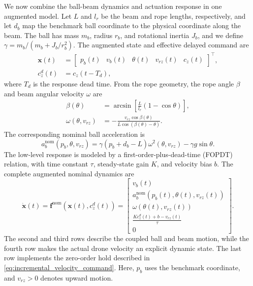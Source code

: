 \documentclass[letterpaper, 10 pt, conference]{ieeeconf}  %
\begin{document}
We now combine the ball-beam dynamics and actuation response in one augmented model. Let $L$ and $l_r$ be the
beam and rope lengths, respectively, and let $d_b$ map the benchmark ball coordinate to the physical coordinate
along the beam. The ball has mass $m_b$, radius $r_b$, and rotational inertia $J_b$, and we define
$\gamma=m_b/(m_b+J_b/r_b^2)$. The augmented state and effective delayed command are
\begin{equation}
\begin{aligned}
    \mathbf x(t)
    &=\begin{bmatrix}
        p_b(t)&v_b(t)&\theta(t)&v_{rz}(t)&c_z(t)
    \end{bmatrix}^{\!\top},\\
    c_z^d(t)&=c_z(t-T_d),
\end{aligned}
    \label{eq:augmented_nominal_state}
\end{equation}
where $T_d$ is the response dead time. From the rope geometry, the rope angle $\beta$ and beam angular velocity $\omega$ are
\begin{equation}
\begin{aligned}
    \beta(\theta)&=\arcsin\!\left[\frac{L}{l_r}(1-\cos\theta)\right],\\
    \omega(\theta,v_{rz})&=-\frac{v_{rz}\cos\beta(\theta)}
    {L\cos\!\left(\beta(\theta)-\theta\right)}.
\end{aligned}
    \label{eq:beam_geometry}
\end{equation}
The corresponding nominal ball acceleration is
\begin{equation}
    a_b^{\mathrm{nom}}(p_b,\theta,v_{rz})
    =\gamma(p_b+d_b-L)\omega^2(\theta,v_{rz})-\gamma g\sin\theta.
    \label{eq:nominal_ball_acceleration}
\end{equation}
The low-level response is modeled by a first-order-plus-dead-time (FOPDT) relation, with time constant $\tau$,
steady-state gain $K$, and velocity bias $b$. The complete augmented nominal dynamics are
\begin{equation}
    \dot{\mathbf x}(t)
    =\mathbf f^{\mathrm{nom}}
    \!\left(\mathbf x(t),c_z^d(t)\right)
    =
    \begin{bmatrix}
        v_b(t)\\[1mm]
        a_b^{\mathrm{nom}}\!\left(p_b(t),\theta(t),v_{rz}(t)\right)\\[1mm]
        \omega\!\left(\theta(t),v_{rz}(t)\right)\\[1mm]
        \displaystyle\frac{Kc_z^d(t)+b-v_{rz}(t)}{\tau}\\[2mm]
        0
    \end{bmatrix}.
    \label{eq:augmented_nominal_dynamics}
\end{equation}
The second and third rows describe the coupled ball and beam motion, while the fourth row makes the actual drone
velocity an explicit dynamic state. The last row implements the zero-order hold described in
\eqref{eq:incremental_velocity_command}. Here, $p_b$ uses the benchmark coordinate, and $v_{rz}>0$ denotes upward
motion.
\end{document}
